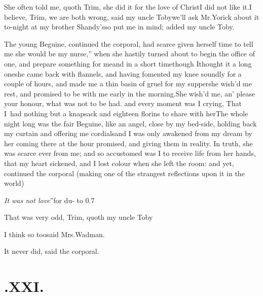 \documentclass{article}
\begin{document}
\tsh She often told me, quoth Trim, she did it
for the love of Christ\tsk I did not like it.\tsh I
believe, Trim, we are both wrong, said my uncle
Toby\tsk we’ll ask Mr.\@ Yorick about it
to-night at my brother Shandy’s\tsh so put me
in mind; added my uncle Toby.

The young Beguine, continued the corporal, had scarce
given herself time to tell me \lqq she would be my nurse,”\break
when she hastily turned about to begin the office of one, and
prepare something for me\tsh and in a short
time\tsk though I\break thought it a long one\tsk she came back with
flannels, \etc \etc and having fomented my knee soundly for a
couple of hours, \etc and made me a thin basin of gruel for my
supper\tsk she wish’d me rest, and promised to be with me
early in the morning.\tsh She wish’d me, an’
please your honour, what was not to be had.
and every moment was I crying, That I~had nothing but a
knapsack and eighteen florins to share with her\tsh The
whole night long was the fair Beguine, like an angel, close
by my bed-side, holding back my curtain and offering me
cordials\tsk and I was only awakened from my dream by her coming
there at the hour promised, and giving them in reality. In truth,
she was scarce ever from me; and so accustomed was I to receive
life from her hands, that my heart sickened, and I lost colour when
she left the room: and yet, continued the corporal 
(making one of the strangest reflections upon it in
the world)\tsh

\tsh \lqq\textit{It was not love}”\tsh for du-\break
{}
\hbox to 0.7

That was very odd, Trim, quoth my uncle Toby\tsh

I think so too\tsk said Mrs.\@ Wadman.

It never did, said the corporal.

\vfill{}\eject\null
\section{.\enspace XXI.}
\end{document}

